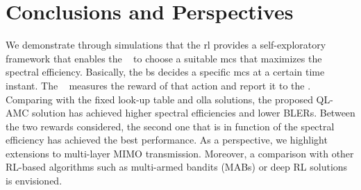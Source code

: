 \section{Conclusions and Perspectives}
\label{sec:amc-conclusion}
We demonstrate through simulations that the \gls{rl} provides a self-exploratory framework that enables the \bs~ to choose a suitable \gls{mcs} that maximizes the spectral efficiency.
%
Basically, the \gls{bs} decides a specific \gls{mcs} at a certain time instant. The \ue~ measures the reward of that action and report it to the \bs.
%
Comparing with the fixed look-up table and \gls{olla} solutions, the proposed QL-AMC solution has achieved higher spectral efficiencies and lower BLERs.
%
Between the two rewards considered, the second one that is in function of the spectral efficiency has achieved the best performance.
%
As a perspective, we highlight extensions to multi-layer MIMO transmission. Moreover, a comparison with other RL-based algorithms such as multi-armed bandits (MABs) \cite{zhou2015survey} or deep RL solutions \cite{DeepRLSurvey} is envisioned.
%
%


